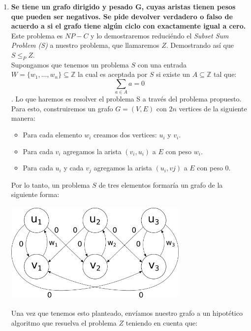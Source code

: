 \documentclass{article}
\newcommand{\Z}{\mathbb{Z}}
\newcommand\tab[1][0.5cm]{\hspace*{#1}}
\begin{document}
\begin{enumerate}
        \item \textbf{Se tiene un grafo dirigido y pesado G, cuyas aristas tienen pesos que pueden ser negativos. Se pide
            devolver verdadero o falso de acuerdo a si el grafo tiene algún ciclo con exactamente igual a cero.} \\
            \tab Este problema es $NP-C$ y lo demostraremos reduciéndo el \emph{Subset Sum Problem (S)} a nuestro
            problema, que llamaremos $Z$. Demostrando así que $S \leq_{P} Z$. \\
            \tab Supongamos que tenemos un problema $S$ con una entrada $W = \{w_{1}, ..., w_{n}\} \subseteq \Z$
                la cual es aceptada por $S$ si existe un $A\subseteq \Z$ tal que: $$\sum_{a \in A} a = 0$$.
                \tab Lo que haremos es resolver el problema S a través del problema propuesto. Para esto,
                construiremos un grafo $G = (V, E)$ con $2n$ vertices de la siguiente manera:
                \begin{itemize}
                    \item Para cada elemento $w_{i}$ creamos dos vertices: $u_{i}$ y $v_{i}$.
                    \item Para cada $v_{i}$ agregamos la arista $(v_{i}, u_{i})$ a $E$ con peso $w_{i}$.
                    \item Para cada $u_{i}$ y cada $v_{j}$ agregamos la arista $(u_{i}, v{j})$ a $E$ con peso $0$.
                \end{itemize}
            \tab\tab Por lo tanto, un problema $S$ de tres elementos formaría un grafo de la siguiente forma:
                \begin{center}
                    \includegraphics[width=9cm, height=5cm]{images/Problema6}
                \end{center}
            \tab\tab Una vez que tenemos esto planteado, envíamos nuestro grafo a un hipotético algoritmo
                que resuelva el problema $Z$ teniendo en cuenta que:
                \begin{itemize}

\end{itemize}
\end{enumerate}
\end{document}
